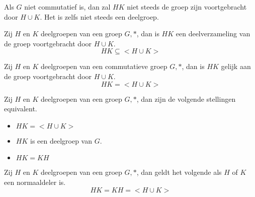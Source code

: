 \documentclass[main.tex]{subfiles}
\begin{document}
\begin{opm}
  \label{opm:verm-deelgroepen-niet-noodzakelijk-deelgroep}
  Als $G$ niet commutatief is, dan zal $HK$ niet steeds de groep zijn voortgebracht door $H\cup K$.
  Het is zelfs niet steeds een deelgroep.
\end{opm}

\begin{st}
  \label{st:verm-deelgroepen-deel-van-voortbrenging-van-unie}
  Zij $H$ en $K$ deelgroepen van een groep $G,*$, dan is $HK$ een deelverzameling van de groep voortgebracht door $H\cup K$.
  \[ HK \subseteq <H\cup K> \]
\end{st}

\begin{st}
  Zij $H$ en $K$ deelgroepen van een commutatieve groep $G,*$, dan is $HK$ gelijk aan de groep voortgebracht door $H\cup K$.
  \[ HK = <H\cup K> \]
\end{st}

\begin{pr}
  Zij $H$ en $K$ deelgroepen van een groep $G,*$, dan zijn de volgende stellingen equivalent.
  \begin{itemize}
  \item $HK = <H\cup K>$
  \item $HK$ is een deelgroep van $G$.
  \item $HK = KH$
  \end{itemize}
\end{pr}

\begin{gev}
  Zij $H$ en $K$ deelgroepen van een groep $G,*$, dan geldt het volgende als $H$ of $K$ een normaaldeler is.
  \[ HK = KH = <H\cup K> \]
\end{gev}
\end{document}
